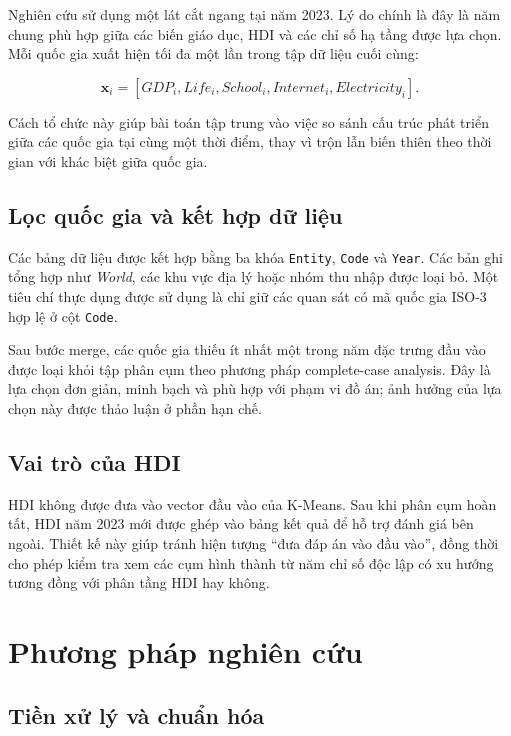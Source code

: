 \documentclass[11pt,a4paper]{article}
\begin{document}
Nghiên cứu sử dụng một lát cắt ngang tại năm 2023. Lý do chính là đây là năm chung phù hợp giữa các biến giáo dục, HDI và các chỉ số hạ tầng được lựa chọn. Mỗi quốc gia xuất hiện tối đa một lần trong tập dữ liệu cuối cùng:

\begin{equation}
\mathbf{x}_i = [GDP_i, Life_i, School_i, Internet_i, Electricity_i].
\end{equation}

Cách tổ chức này giúp bài toán tập trung vào việc so sánh cấu trúc phát triển giữa các quốc gia tại cùng một thời điểm, thay vì trộn lẫn biến thiên theo thời gian với khác biệt giữa quốc gia.

\subsection{Lọc quốc gia và kết hợp dữ liệu}

Các bảng dữ liệu được kết hợp bằng ba khóa \texttt{Entity}, \texttt{Code} và \texttt{Year}. Các bản ghi tổng hợp như \textit{World}, các khu vực địa lý hoặc nhóm thu nhập được loại bỏ. Một tiêu chí thực dụng được sử dụng là chỉ giữ các quan sát có mã quốc gia ISO-3 hợp lệ ở cột \texttt{Code}.

Sau bước merge, các quốc gia thiếu ít nhất một trong năm đặc trưng đầu vào được loại khỏi tập phân cụm theo phương pháp complete-case analysis. Đây là lựa chọn đơn giản, minh bạch và phù hợp với phạm vi đồ án; ảnh hưởng của lựa chọn này được thảo luận ở phần hạn chế.

\subsection{Vai trò của HDI}

HDI không được đưa vào vector đầu vào của K-Means. Sau khi phân cụm hoàn tất, HDI năm 2023 mới được ghép vào bảng kết quả để hỗ trợ đánh giá bên ngoài. Thiết kế này giúp tránh hiện tượng ``đưa đáp án vào đầu vào'', đồng thời cho phép kiểm tra xem các cụm hình thành từ năm chỉ số độc lập có xu hướng tương đồng với phân tầng HDI hay không.

\section{Phương pháp nghiên cứu}

\subsection{Tiền xử lý và chuẩn hóa}
\end{document}
